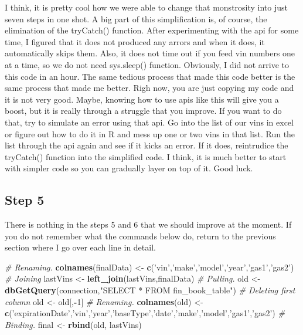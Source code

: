 \documentclass[]{book}
\newenvironment{Shaded}{\begin{snugshade}}{\end{snugshade}}
\newcommand{\CommentTok}[1]{\textcolor[rgb]{0.56,0.35,0.01}{\textit{#1}}}
\newcommand{\DecValTok}[1]{\textcolor[rgb]{0.00,0.00,0.81}{#1}}
\newcommand{\KeywordTok}[1]{\textcolor[rgb]{0.13,0.29,0.53}{\textbf{#1}}}
\newcommand{\NormalTok}[1]{#1}
\newcommand{\OperatorTok}[1]{\textcolor[rgb]{0.81,0.36,0.00}{\textbf{#1}}}
\newcommand{\StringTok}[1]{\textcolor[rgb]{0.31,0.60,0.02}{#1}}
\begin{document}
I think, it is pretty cool how we were able to change that monstrosity into just seven steps in one shot. A big part of this simplification is, of course, the elimination of the tryCatch() function. After experimenting with the api for some time, I figured that it does not produced any arrors and when it does, it automatically skips them. Also, it does not time out if you feed vin numbers one at a time, so we do not need sys.sleep() function. Obviously, I did not arrive to this code in an hour. The same tedious process that made this code better is the same process that made me better. Righ now, you are just copying my code and it is not very good. Maybe, knowing how to use apis like this will give you a boost, but it is really through a struggle that you improve. If you want to do that, try to simulate an error using that api. Go into the list of our vins in excel or figure out how to do it in R and mess up one or two vins in that list. Run the list through the api again and see if it kicks an error. If it does, reintrudice the tryCatch() function into the simplified code. I think, it is much better to start with simpler code so you can gradually layer on top of it. Good luck.

\hypertarget{step-5-2}{%
\subsection{Step 5}\label{step-5-2}}

There is nothing in the steps 5 and 6 that we should improve at the moment. If you do not remember what the commands below do, return to the previous section where I go over each line in detail.

\begin{Shaded}
\begin{Highlighting}[]
\CommentTok{# Renaming.}
\KeywordTok{colnames}\NormalTok{(finalData) <-}\StringTok{ }\KeywordTok{c}\NormalTok{(}\StringTok{'vin'}\NormalTok{,}\StringTok{'make'}\NormalTok{,}\StringTok{'model'}\NormalTok{,}\StringTok{'year'}\NormalTok{,}\StringTok{'gas1'}\NormalTok{,}\StringTok{'gas2'}\NormalTok{)}
\CommentTok{# Joining}
\NormalTok{lastVins <-}\StringTok{ }\KeywordTok{left_join}\NormalTok{(lastVins,finalData)}
\CommentTok{# Pulling.}
\NormalTok{old <-}\StringTok{ }\KeywordTok{dbGetQuery}\NormalTok{(connection,}\StringTok{"SELECT * FROM fin_book_table"}\NormalTok{)}
\CommentTok{# Deleting first column}
\NormalTok{old <-}\StringTok{ }\NormalTok{old[,}\OperatorTok{-}\DecValTok{1}\NormalTok{]}
\CommentTok{# Renaming.}
\KeywordTok{colnames}\NormalTok{(old) <-}\StringTok{ }
\StringTok{  }\KeywordTok{c}\NormalTok{(}\StringTok{'expirationDate'}\NormalTok{,}\StringTok{'vin'}\NormalTok{,}\StringTok{'year'}\NormalTok{,}\StringTok{'baseType'}\NormalTok{,}\StringTok{'date'}\NormalTok{,}\StringTok{'make'}\NormalTok{,}\StringTok{'model'}\NormalTok{,}\StringTok{'gas1'}\NormalTok{,}\StringTok{'gas2'}\NormalTok{)}
\CommentTok{# Binding.}
\NormalTok{final <-}\StringTok{ }\KeywordTok{rbind}\NormalTok{(old, lastVins)}
\end{Highlighting}
\end{Shaded}
\end{document}
